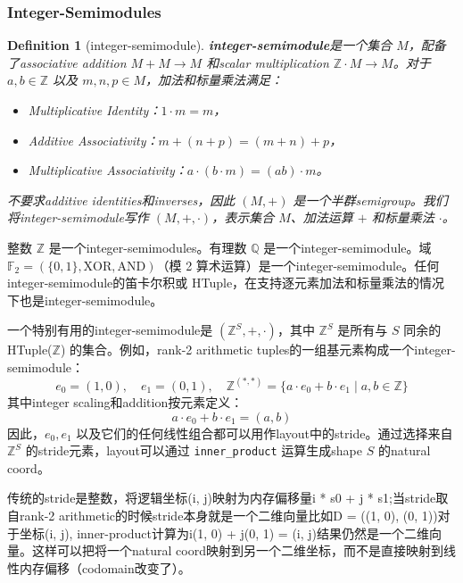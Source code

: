 \documentclass{article}
\newtheorem{definition}{Definition}[section]
\begin{document}
\subsubsection{Integer-Semimodules}

\begin{definition}[integer-semimodule]
\textbf{integer-semimodule}是一个集合 \( M \)，配备了associative addition \( M + M \to M \) 和scalar multiplication \( \mathbb{Z} \cdot M \to M \)。对于 \( a, b \in \mathbb{Z} \) 以及 \( m, n, p \in M \)，加法和标量乘法满足：
\begin{itemize}
\item Multiplicative Identity：\( 1 \cdot m = m \)，
\item Additive Associativity：\( m + (n + p) = (m + n) + p \)，
\item Multiplicative Associativity：\( a \cdot (b \cdot m) = (ab) \cdot m \)。
\end{itemize}
不要求additive identities和inverses，因此 \( (M, +) \) 是一个半群semigroup。我们将integer-semimodule写作 \( (M, +, \cdot) \)，表示集合 \( M \)、加法运算 \( + \) 和标量乘法 \( \cdot \)。
\end{definition}

整数 \( \mathbb{Z} \) 是一个integer-semimodules。有理数 \( \mathbb{Q} \) 是一个integer-semimodule。域 \( \mathbb{F}_2 = (\{0, 1\}, \text{XOR}, \text{AND}) \)（模 2 算术运算）是一个integer-semimodule。任何integer-semimodule的笛卡尔积或 HTuple，在支持逐元素加法和标量乘法的情况下也是integer-semimodule。

一个特别有用的integer-semimodule是 \( (\mathbb{Z}^S, +, \cdot) \)，其中 \( \mathbb{Z}^S \) 是所有与 \( S \) 同余的 HTuple(\( \mathbb{Z} \)) 的集合。例如，rank-2 arithmetic tuples的一组基元素构成一个integer-semimodule：
\[
e_0 = (1, 0), \quad e_1 = (0, 1), \quad \mathbb{Z}^{(*, *)} = \{a \cdot e_0 + b \cdot e_1 \mid a, b \in \mathbb{Z}\}
\]
其中integer scaling和addition按元素定义：
\[
a \cdot e_0 + b \cdot e_1 = (a, b)
\]
因此，\( e_0, e_1 \) 以及它们的任何线性组合都可以用作layout中的stride。通过选择来自 \( \mathbb{Z}^S \) 的stride元素，layout可以通过 \texttt{inner\_product} 运算生成shape \( S \) 的natural coord。
\begin{mycomment}
传统的stride是整数，将逻辑坐标(i, j)映射为内存偏移量i * s0 + j * s1;当stride取自rank-2 arithmetic的时候stride本身就是一个二维向量比如D = ((1, 0), (0, 1))对于坐标(i, j), inner-product计算为i(1, 0) + j(0, 1) = (i, j)结果仍然是一个二维向量。这样可以把将一个natural coord映射到另一个二维坐标，而不是直接映射到线性内存偏移（codomain改变了）。   
\end{mycomment}
\end{document}
